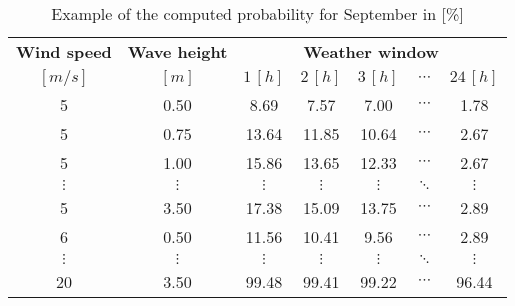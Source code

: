 \begin{table}
\label{tab:proba}
\begin{tabular}{ccccccc}
\hline
{\bf Wind speed} & {\bf Wave height} & \multicolumn{ 5}{c}{{\bf Weather window}} \\
$[m/s]$      &      $[m]$      &          $1\, [h]$ &          $2\, [h]$ &          $3\, [h]$ &  $\cdots$ &         $24\, [h]$ \\
\hline
5 &       0.50 &       8.69 &       7.57 &       7.00 &  $\cdots$ &       1.78 \\
5 &       0.75 &      13.64 &      11.85 &      10.64 &  $\cdots$ &       2.67 \\
5 &       1.00 &      15.86 &      13.65 &      12.33 &  $\cdots$ &       2.67 \\
 $\vdots$ &  $\vdots$ &  $\vdots$ &  $\vdots$ &  $\vdots$ &  $\ddots$ &  $\vdots$ \\
5 &       3.50 &      17.38 &      15.09 &      13.75 &  $\cdots$ &       2.89 \\
6 &       0.50 &      11.56 &      10.41 &       9.56 &  $\cdots$ &       2.89 \\
 $\vdots$ &  $\vdots$ &  $\vdots$ &  $\vdots$ &  $\vdots$ & $\ddots$           &  $\vdots$ \\
20 &       3.50 &      99.48 &      99.41 &      99.22 &  $\cdots$ &      96.44 \\
\hline
\end{tabular}  

\caption{Example of the computed probability for September in [\%]}
\end{table}